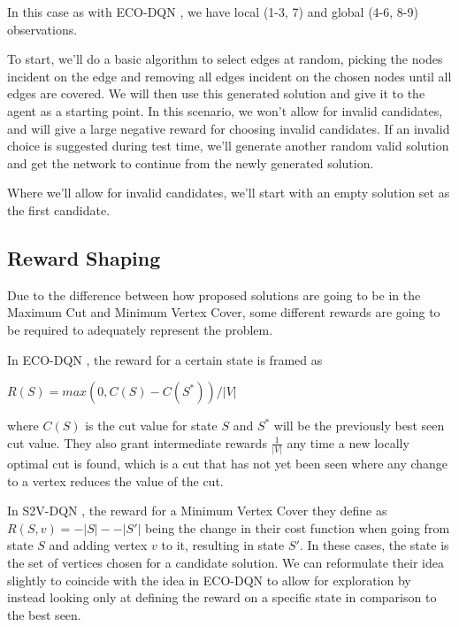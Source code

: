 \documentclass{article}
\begin{document}
In this case as with ECO-DQN \cite{eco-dqn}, we have local (1-3, 7) and global (4-6, 8-9) observations.

To start, we'll do a basic algorithm to select edges at random, picking the nodes incident on the edge and removing all edges incident on the chosen nodes until all edges are covered. We will then use this generated solution and give it to the agent as a starting point. In this scenario, we won't allow for invalid candidates, and will give a large negative reward for choosing invalid candidates. If an invalid choice is suggested during test time, we'll generate another random valid solution and get the network to continue from the newly generated solution. 

Where we'll allow for invalid candidates, we'll start with an empty solution set as the first candidate.

\subsection{Reward Shaping}

Due to the difference between how proposed solutions are going to be in the Maximum Cut and Minimum Vertex Cover, some different rewards are going to be required to adequately represent the problem.

In ECO-DQN \cite{eco-dqn}, the reward for a certain state is framed as

$R(S) = max(0, C(S) - C(S^*)) / |V|$

where $C(S)$ is the cut value for state $S$ and $S^*$ will be the previously best seen cut value. They also grant intermediate rewards $\frac{1}{|V|}$ any time a new locally optimal cut is found, which is a cut that has not yet been seen where any change to a vertex reduces the value of the cut.

In S2V-DQN \cite{s2v-dqn}, the reward for a Minimum Vertex Cover they define as $R(S, v) = -|S| - -|S'|$ being the change in their cost function when going from state $S$ and adding vertex $v$ to it, resulting in state $S'$. In these cases, the state is the set of vertices chosen for a candidate solution. We can reformulate their idea slightly to coincide with the idea in ECO-DQN to allow for exploration by instead looking only at defining the reward on a specific state in comparison to the best seen. 
\end{document}
